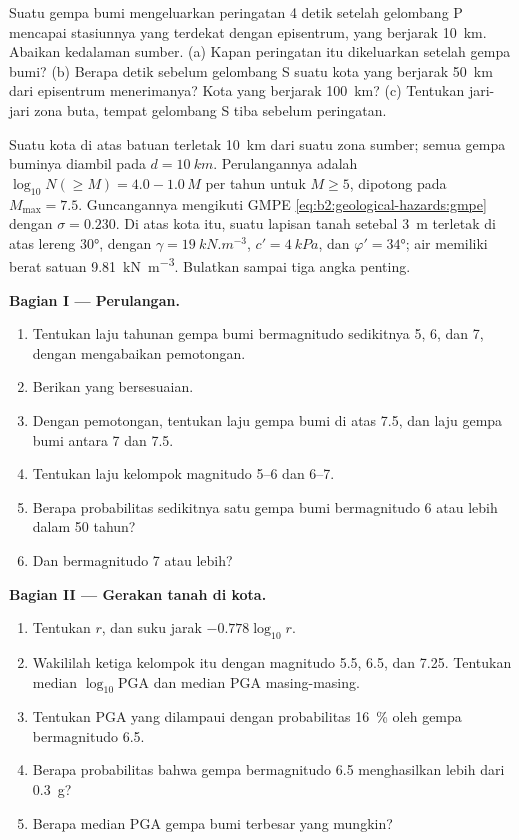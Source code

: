 \begin{exercise}[$\star\star\star$]\label{exo:b2:geological-hazards:12}
Suatu  gempa bumi mengeluarkan peringatan 4 detik setelah gelombang P mencapai stasiunnya yang
terdekat dengan episentrum, yang berjarak \qty{10}{km}. Abaikan kedalaman sumber. (a) Kapan
peringatan itu dikeluarkan setelah gempa bumi? (b) Berapa detik sebelum gelombang S suatu kota yang berjarak \qty{50}{km}
dari episentrum menerimanya? Kota yang berjarak \qty{100}{km}? (c) Tentukan jari-jari zona buta, tempat
gelombang S tiba sebelum peringatan.
\end{exercise}

\begin{problem}\label{pb:b2:geological-hazards:1}
Suatu kota di atas batuan terletak \qty{10}{km} dari suatu zona sumber; semua gempa buminya diambil pada
$d = \qty{10}{km}$. Perulangannya adalah $\log_{10} N(\geq M) = 4.0 - 1.0\,M$ per tahun untuk $M \geq 5$,
dipotong pada $M_{\max} = 7.5$. Guncangannya mengikuti GMPE \eqref{eq:b2:geological-hazards:gmpe}
dengan $\sigma = 0.230$. Di atas kota itu, suatu lapisan tanah setebal \qty{3}{m} terletak di atas lereng \ang{30},
dengan $\gamma = \qty{19}{kN.m^{-3}}$, $c' = \qty{4}{kPa}$, dan $\varphi' = \ang{34}$; air memiliki berat
satuan \qty{9.81}{kN.m^{-3}}. Bulatkan sampai tiga angka penting.

\noindent\textbf{Bagian I --- Perulangan.}
\begin{enumerate}
  \item Tentukan laju tahunan gempa bumi bermagnitudo sedikitnya 5, 6, dan 7, dengan mengabaikan
        pemotongan.
  \item Berikan  yang bersesuaian.
  \item Dengan pemotongan, tentukan laju gempa bumi di atas 7.5, dan laju gempa bumi antara 7
        dan 7.5.
  \item Tentukan laju kelompok magnitudo 5--6 dan 6--7.
  \item Berapa probabilitas sedikitnya satu gempa bumi bermagnitudo 6 atau lebih dalam 50 tahun?
  \item Dan bermagnitudo 7 atau lebih?
\end{enumerate}

\noindent\textbf{Bagian II --- Gerakan tanah di kota.}
\begin{enumerate}[resume]
  \item Tentukan $r$, dan suku jarak $-0.778\log_{10} r$.
  \item Wakililah ketiga kelompok itu dengan magnitudo 5.5, 6.5, dan 7.25. Tentukan median
        $\log_{10}\mathrm{PGA}$ dan median PGA masing-masing.
  \item Tentukan PGA yang dilampaui dengan probabilitas \qty{16}{\percent} oleh gempa bermagnitudo 6.5.
  \item Berapa probabilitas bahwa gempa bermagnitudo 6.5 menghasilkan lebih dari \qty{0.3}{g}?
  \item Berapa median PGA gempa bumi terbesar yang mungkin?
\end{enumerate}


\end{problem}
